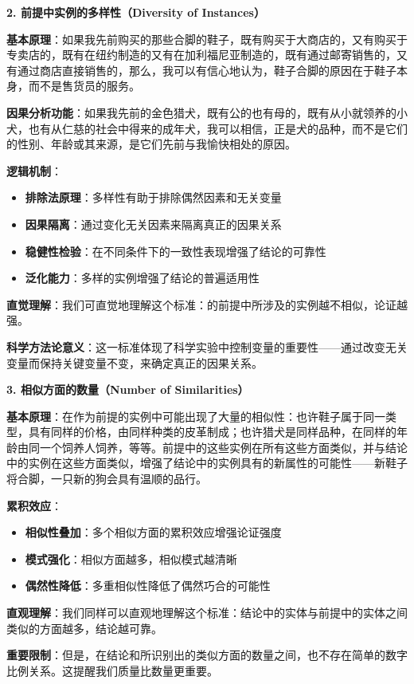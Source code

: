 \begin{theorembox}[title=标准二：前提中实例多样性的深入分析]

\textbf{2. 前提中实例的多样性（Diversity of Instances）}

\textbf{基本原理}：如果我先前购买的那些合脚的鞋子，既有购买于大商店的，又有购买于专卖店的，既有在纽约制造的又有在加利福尼亚制造的，既有通过邮寄销售的，又有通过商店直接销售的，那么，我可以有信心地认为，鞋子合脚的原因在于鞋子本身，而不是售货员的服务。

\textbf{因果分析功能}：如果我先前的金色猎犬，既有公的也有母的，既有从小就领养的小犬，也有从仁慈的社会中得来的成年犬，我可以相信，正是犬的品种，而不是它们的性别、年龄或其来源，是它们先前与我愉快相处的原因。

\textbf{逻辑机制}：
\begin{itemize}
\item \textbf{排除法原理}：多样性有助于排除偶然因素和无关变量
\item \textbf{因果隔离}：通过变化无关因素来隔离真正的因果关系
\item \textbf{稳健性检验}：在不同条件下的一致性表现增强了结论的可靠性
\item \textbf{泛化能力}：多样的实例增强了结论的普遍适用性
\end{itemize}

\textbf{直觉理解}：我们可直觉地理解这个标准：的前提中所涉及的实例越不相似，论证越强。

\textbf{科学方法论意义}：这一标准体现了科学实验中控制变量的重要性——通过改变无关变量而保持关键变量不变，来确定真正的因果关系。
\end{theorembox}

\begin{theorembox}[title=标准三：相似方面数量的深入分析]

\textbf{3. 相似方面的数量（Number of Similarities）}

\textbf{基本原理}：在作为前提的实例中可能出现了大量的相似性：也许鞋子属于同一类型，具有同样的价格，由同样种类的皮革制成；也许猎犬是同样品种，在同样的年龄由同一个饲养人饲养，等等。前提中的这些实例在所有这些方面类似，并与结论中的实例在这些方面类似，增强了结论中的实例具有的新属性的可能性——新鞋子将合脚，一只新的狗会具有温顺的品行。

\textbf{累积效应}：
\begin{itemize}
\item \textbf{相似性叠加}：多个相似方面的累积效应增强论证强度
\item \textbf{模式强化}：相似方面越多，相似模式越清晰
\item \textbf{偶然性降低}：多重相似性降低了偶然巧合的可能性
\end{itemize}

\textbf{直观理解}：我们同样可以直观地理解这个标准：结论中的实体与前提中的实体之间类似的方面越多，结论越可靠。

\textbf{重要限制}：但是，在结论和所识别出的类似方面的数量之间，也不存在简单的数字比例关系。这提醒我们质量比数量更重要。
\end{theorembox}

